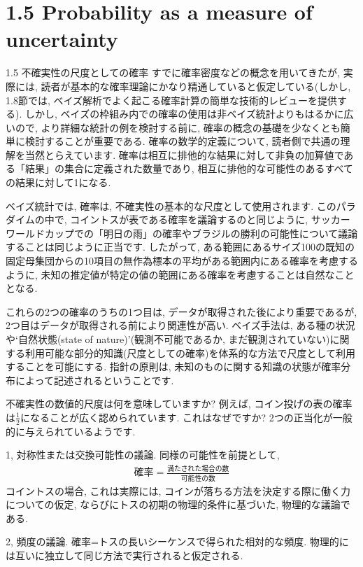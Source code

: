 \documentclass[10pt,dvipdfmx,a4]{beamer}
\newcommand{\eqn}[1]{\begin{align*}#1\end{align*}}
\begin{document}
\section{1.5 Probability as a measure of uncertainty}
\begin{frame}{1.5 不確実性の尺度としての確率}
すでに確率密度などの概念を用いてきたが, 実際には, 読者が基本的な確率理論にかなり精通していると仮定している(しかし, 1.8節では, ベイズ解析でよく起こる確率計算の簡単な技術的レビューを提供する).
しかし, ベイズの枠組み内での確率の使用は非ベイズ統計よりもはるかに広いので, より詳細な統計の例を検討する前に, 確率の概念の基礎を少なくとも簡単に検討することが重要である.
確率の数学的定義について, 読者側で共通の理解を当然とらえています.
確率は相互に排他的な結果に対して非負の加算値である「結果」の集合に定義された数量であり, 相互に排他的な可能性のあるすべての結果に対して1になる.

ベイズ統計では, 確率は, 不確実性の基本的な尺度として使用されます.
このパラダイムの中で, コイントスが表である確率を議論するのと同じように, サッカーワールドカップでの「明日の雨」の確率やブラジルの勝利の可能性について議論することは同じように正当です.
したがって, ある範囲にあるサイズ100の既知の固定母集団からの10項目の無作為標本の平均がある範囲内にある確率を考慮するように, 未知の推定値が特定の値の範囲にある確率を考慮することは自然なこととなる.
\end{frame}


\begin{frame}
これらの2つの確率のうちの1つ目は, データが取得された後により重要であるが, 2つ目はデータが取得される前により関連性が高い.
ベイズ手法は, ある種の状況や`自然状態(state of nature)'(観測不可能であるか, まだ観測されていない)に関する利用可能な部分的知識(尺度としての確率)を体系的な方法で尺度として利用することを可能にする.
指針の原則は, 未知のものに関する知識の状態が確率分布によって記述されるということです.

不確実性の数値的尺度は何を意味していますか?
例えば, コイン投げの表の確率は$\tfrac{1}{2}$になることが広く認められています.
これはなぜですか?
2つの正当化が一般的に与えられているようです.

1, 対称性または交換可能性の議論.
同様の可能性を前提として,
\eqn{\text{確率}=\frac{\text{満たされた場合の数}}{\text{可能性の数}}}
コイントスの場合, これは実際には, コインが落ちる方法を決定する際に働く力についての仮定, ならびにトスの初期の物理的条件に基づいた, 物理的な議論である.

2, 頻度の議論.
確率=トスの長いシーケンスで得られた相対的な頻度.
物理的には互いに独立して同じ方法で実行されると仮定される.
\end{frame}
\end{document}
